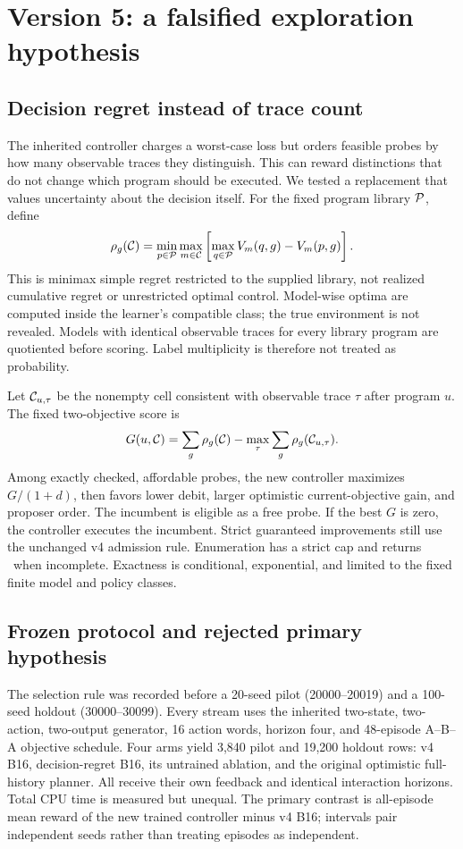 \section{Version 5: a falsified exploration hypothesis}
\subsection{Decision regret instead of trace count}
The inherited controller charges a worst-case loss but orders feasible probes by
how many observable traces they distinguish. This can reward distinctions that do
not change which program should be executed. We tested a replacement that values
uncertainty about the decision itself. For the fixed program library $\mathcal P$, define
\begin{equation}
 \rho_g(\mathcal C)=\min_{p\in\mathcal P}\max_{m\in\mathcal C}
 \left[\max_{q\in\mathcal P}V_m(q,g)-V_m(p,g)\right].
\end{equation}
This is minimax simple regret restricted to the supplied library, not realized
cumulative regret or unrestricted optimal control. Model-wise optima are computed
inside the learner's compatible class; the true environment is not revealed.
Models with identical observable traces for every library program are quotiented
before scoring. Label multiplicity is therefore not treated as probability.

Let $\mathcal C_{u,\tau}$ be the nonempty cell consistent with observable trace $\tau$
after program $u$. The fixed two-objective score is
\begin{equation}
 G(u,\mathcal C)=\sum_g\rho_g(\mathcal C)-\max_{\tau}\sum_g\rho_g(\mathcal C_{u,\tau}).
 \label{eq:regretprobe}
\end{equation}
Among exactly checked, affordable probes, the new controller maximizes
$G/(1+d)$, then favors lower debit, larger optimistic current-objective gain,
and proposer order. The incumbent is eligible as a free probe. If the best
$G$ is zero, the controller executes the incumbent. Strict guaranteed
improvements still use the unchanged v4 admission rule. Enumeration has a strict
cap and returns \unk\ when incomplete. Exactness is conditional, exponential,
and limited to the fixed finite model and policy classes.

\subsection{Frozen protocol and rejected primary hypothesis}
The selection rule was recorded before a 20-seed pilot (20000--20019) and a
100-seed holdout (30000--30099). Every stream uses the inherited two-state,
two-action, two-output generator, 16 action words, horizon four, and 48-episode
A--B--A objective schedule. Four arms yield 3,840 pilot and 19,200 holdout rows:
v4 B16, decision-regret B16, its untrained ablation, and the original optimistic
full-history planner. All receive their own feedback and identical interaction
horizons. Total CPU time is measured but unequal. The primary contrast is
all-episode mean reward of the new trained controller minus v4 B16; intervals
pair independent seeds rather than treating episodes as independent.

